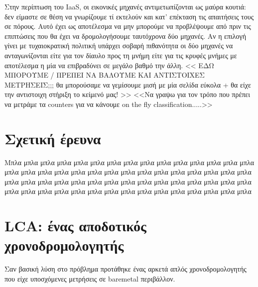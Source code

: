 Στην περίπτωση του IaaS, οι εικονικές μηχανές αντιμετωπίζονται ως μαύρα κουτιά:
δεν είμαστε σε θέση να γνωρίζουμε τί εκτελούν και κατ' επέκταση τις
απαιτήσεις τους σε πόρους. Αυτό έχει ως αποτέλεσμα να μην μπορούμε να
προβλέψουμε από πριν τις επιπτώσεις που θα έχει να δρομολογήσουμε ταυτόχρονα δύο
μηχανές. Αν η επιλογή γίνει με τυχαιοκρατική πολιτική υπάρχει σοβαρή πιθανότητα
οι δύο μηχανές να ανταγωνίζονται είτε για τον δίαυλο προς τη μνήμη είτε για τις
κρυφές μνήμες με αποτέλεσμα η μία να επιβραδύνει σε μεγάλο βαθμό την άλλη. <<
ΕΔΩ ΜΠΟΡΟΥΜΕ / ΠΡΕΠΕΙ ΝΑ ΒΑΛΟΥΜΕ ΚΑΙ ΑΝΤΙΣΤΟΙΧΕΣ ΜΕΤΡΗΣΕΙΣ;;; θα μπορούσαμε να
γεμίσουμε μισή με μία σελίδα εύκολα + θα είχε την αντιστοιχη στήριξη το κείμενό
μας! >>
<<Να γραψω για τον τρόπο που πρέπει να μετράμε τα counters για να κάνουμε on the
fly classification.....>>

\section{Σχετική έρευνα}
Μπλα μπλα μπλα μπλα μπλα μπλα μπλα μπλα μπλα μπλα μπλα μπλα μπλα μπλα μπλα 
μπλα μπλα μπλα μπλα μπλα μπλα μπλα μπλα μπλα μπλα μπλα μπλα μπλα μπλα μπλα 
μπλα μπλα μπλα μπλα μπλα μπλα μπλα μπλα μπλα μπλα μπλα μπλα μπλα μπλα μπλα 
μπλα μπλα μπλα μπλα μπλα μπλα μπλα μπλα μπλα μπλα μπλα μπλα μπλα μπλα μπλα 
\section{LCA: ένας αποδοτικός χρονοδρομολογητής}
Σαν βασική λύση στο πρόβλημα προτάθηκε ένας αρκετά απλός χρονοδρομολογητής που
είχε υποσχόμενες μετρήσεις σε baremetal περιβάλλον.
